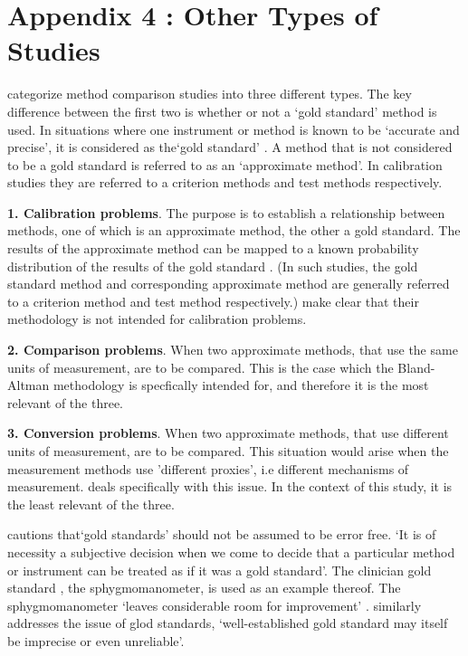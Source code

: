 \documentclass[12pt, a4paper]{report}
\theoremstyle{plain}
\theoremstyle{definition}
\theoremstyle{remark}
\begin{document}
  
	\newpage
	\section{Appendix 4 : Other Types of Studies}
	\citet{lewis} categorize method comparison studies into three	different types.  The key difference between the first two is
	whether or not a `gold standard' method is used. In situations where one instrument or method is known to be `accurate and
	precise', it is considered as the`gold standard' \citep{lewis}. A	method that is not considered to be a gold standard is referred to
	as an `approximate method'. In calibration studies they are	referred to a criterion methods and test methods respectively.
	
	
	\textbf{1. Calibration problems}. The purpose is to establish a	relationship between methods, one of which is an approximate
	method, the other a gold standard. The results of the approximate	method can be mapped to a known probability distribution of the
	results of the gold standard \citep{lewis}. (In such studies, the	gold standard method and corresponding approximate method are
	generally referred to a criterion method and test method respectively.) \citet*{BA83} make clear that their methodology is
	not intended for calibration problems.
	
	\bigskip \textbf{2. Comparison problems}. When two approximate methods, that use the same units of measurement, are to be
	compared. This is the case which the Bland-Altman methodology is specfically intended for, and therefore it is the most relevant of
	the three.
	
	\bigskip \textbf{3. Conversion problems}. When two approximate methods, that use different units of measurement, are to be
	compared. This situation would arise when the measurement methods	use 'different proxies', i.e different mechanisms of measurement.
	\citet{lewis} deals specifically with this issue. In the context of this study, it is the least relevant of the three.
	
	\citet[p.47]{DunnSEME} cautions that`gold standards' should not be
	assumed to be error free. `It is of necessity a subjective decision when we come to decide that a particular method or
	instrument can be treated as if it was a gold standard'. The clinician gold standard , the sphygmomanometer, is used as an
	example thereof.  The sphygmomanometer `leaves considerable room for improvement' \citep{DunnSEME}. \citet{pizzi} similarly
	addresses the issue of glod standards, `well-established gold	standard may itself be imprecise or even unreliable'.
	
\end{document}
